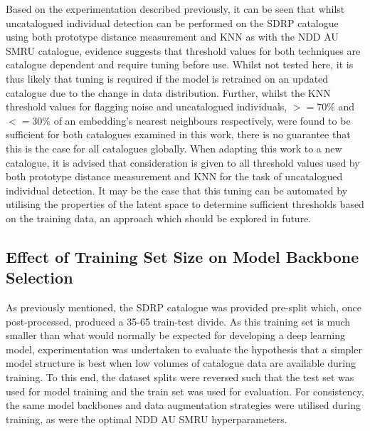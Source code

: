 Based on the experimentation described previously, it can be seen that whilst uncatalogued individual detection can be performed on the SDRP catalogue using both prototype distance measurement and KNN as with the NDD AU SMRU catalogue, evidence suggests that threshold values for both techniques are catalogue dependent and require tuning before use. Whilst not tested here, it is thus likely that tuning is required if the model is retrained on an updated catalogue due to the change in data distribution. Further, whilst the KNN threshold values for flagging noise and uncatalogued individuals, $>=70\%$ and $<=30\%$  of an embedding's nearest neighbours respectively, were found to be sufficient for both catalogues examined in this work, there is no guarantee that this is the case for all catalogues globally. When adapting this work to a new catalogue, it is advised that consideration is given to all threshold values used by both prototype distance measurement and KNN for the task of uncatalogued individual detection. It may be the case that this tuning can be automated by utilising the properties of the latent space to determine sufficient thresholds based on the training data, an approach which should be explored in future.

\subsection{Effect of Training Set Size on Model Backbone Selection}\label{ch:SNNEvaluation,sec:SDRP,sub:SDRPDataset,sub:reversedSDRP}

 As previously mentioned, the SDRP catalogue was provided pre-split which, once post-processed, produced a 35-65 train-test divide. As this training set is much smaller than what would normally be expected for developing a deep learning model, experimentation was undertaken to evaluate the hypothesis that a simpler model structure is best when low volumes of catalogue data are available during training. To this end, the dataset splits were reversed such that the test set was used for model training and the train set was used for evaluation. For consistency, the same model backbones and data augmentation strategies were utilised during training, as were the optimal NDD AU SMRU hyperparameters. 

